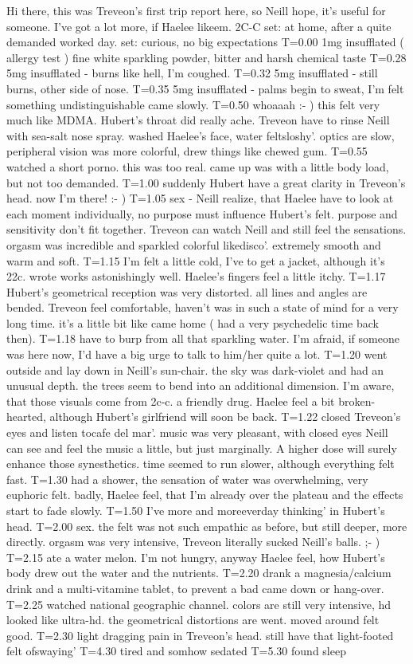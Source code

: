 \documentclass[12pt]{book}
\begin{document}
Hi there, this was Treveon's first trip report here, so Neill hope, it's useful for someone. I've got a lot more, if Haelee likeem. 2C-C set: at home, after a quite demanded worked day. set: curious, no big expectations T=0.00 1mg insufflated ( allergy test ) fine white sparkling powder, bitter and harsh chemical taste T=0.28 5mg insufflated - burns like hell, I'm coughed. T=0.32 5mg insufflated - still burns, other side of nose. T=0.35 5mg insufflated - palms begin to sweat, I'm felt something undistinguishable came slowly. T=0.50 whoaaah :- ) this felt very much like MDMA. Hubert's throat did really ache. Treveon have to rinse Neill with sea-salt nose spray. washed Haelee's face, water feltsloshy'. optics are slow, peripheral vision was more colorful, drew things like chewed gum. T=0.55 watched a short porno. this was too real. came up was with a little body load, but not too demanded. T=1.00 suddenly Hubert have a great clarity in Treveon's head. now I'm there! :- ) T=1.05 sex - Neill realize, that Haelee have to look at each moment individually, no purpose must influence Hubert's felt. purpose and sensitivity don't fit together. Treveon can watch Neill and still feel the sensations. orgasm was incredible and sparkled colorful likedisco'. extremely smooth and warm and soft. T=1.15 I'm felt a little cold, I've to get a jacket, although it's 22c. wrote works astonishingly well. Haelee's fingers feel a little itchy. T=1.17 Hubert's geometrical reception was very distorted. all lines and angles are bended. Treveon feel comfortable, haven't was in such a state of mind for a very long time. it's a little bit like came home ( had a very psychedelic time back then). T=1.18 have to burp from all that sparkling water. I'm afraid, if someone was here now, I'd have a big urge to talk to him/her quite a lot. T=1.20 went outside and lay down in Neill's sun-chair. the sky was dark-violet and had an unusual depth. the trees seem to bend into an additional dimension. I'm aware, that those visuals come from 2c-c. a friendly drug. Haelee feel a bit broken-hearted, although Hubert's girlfriend will soon be back. T=1.22 closed Treveon's eyes and listen tocafe del mar'. music was very pleasant, with closed eyes Neill can see and feel the music a little, but just marginally. A higher dose will surely enhance those synesthetics. time seemed to run slower, although everything felt fast. T=1.30 had a shower, the sensation of water was overwhelming, very euphoric felt. badly, Haelee feel, that I'm already over the plateau and the effects start to fade slowly. T=1.50 I've more and moreeverday thinking' in Hubert's head. T=2.00 sex. the felt was not such empathic as before, but still deeper, more directly. orgasm was very intensive, Treveon literally sucked Neill's balls. ;- ) T=2.15 ate a water melon. I'm not hungry, anyway Haelee feel, how Hubert's body drew out the water and the nutrients. T=2.20 drank a magnesia/calcium drink and a multi-vitamine tablet, to prevent a bad came down or hang-over. T=2.25 watched national geographic channel. colors are still very intensive, hd looked like ultra-hd. the geometrical distortions are went. moved around felt good. T=2.30 light dragging pain in Treveon's head. still have that light-footed felt ofswaying' T=4.30 tired and somhow sedated T=5.30 found sleep 
\end{document}
